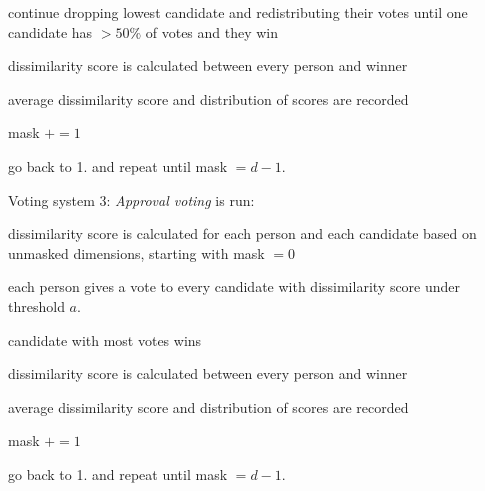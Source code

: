 \begin{enum_tight}
\begin{enum_tight}
\begin{enum_tight}
\item continue dropping lowest candidate and redistributing their votes until one candidate has $> 50\%$ of votes and they win
\end{enum_tight}
\item dissimilarity score is calculated between every person and winner
\item average dissimilarity score and distribution of scores are recorded
\item mask $+= 1$
\item go back to 1. and repeat until mask $= d-1$.
\end{enum_tight}
\item Voting system 3: {\it Approval voting} is run:
\begin{enum_tight}
\item dissimilarity score is calculated for each person and each candidate based on unmasked dimensions, starting with mask $=0$
\item each person gives a vote to every candidate with dissimilarity score under threshold $a$.
\item candidate with most votes wins
\item dissimilarity score is calculated between every person and winner
\item average dissimilarity score and distribution of scores are recorded
\item mask $+= 1$
\item go back to 1. and repeat until mask $= d-1$.
\end{enum_tight}
\end{enum_tight}
